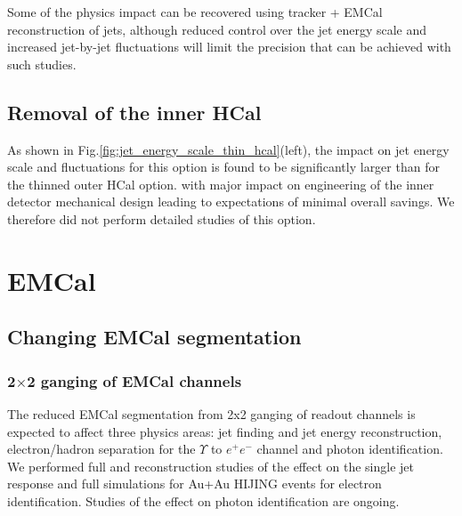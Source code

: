 Some of the physics impact can be recovered using tracker + EMCal reconstruction of jets, although reduced control over the jet 
energy scale and increased jet-by-jet fluctuations will limit the precision that can be achieved with such studies.

\subsection{Removal of the inner HCal}

As shown in Fig.\ref{fig:jet_energy_scale_thin_hcal}(left), the impact on jet energy scale and fluctuations for this option is 
found to be significantly larger than for the thinned outer HCal option. 
with major impact on engineering of the inner detector mechanical design leading to expectations of minimal overall savings.
We therefore did not perform detailed studies of this option.

\section{EMCal}
\subsection{Changing EMCal segmentation}
\subsubsection{2$\times$2 ganging of EMCal channels}
The reduced EMCal segmentation from 2x2 ganging of readout channels is expected to affect three physics areas: jet finding 
and jet energy reconstruction, electron/hadron separation for the $\Upsilon$ to $e^+ e^-$ channel and photon identification.
We performed full \geant and reconstruction studies of the effect on the single jet response and full \geant simulations for 
Au+Au HIJING events for electron identification. Studies of the effect on photon identification are ongoing.

